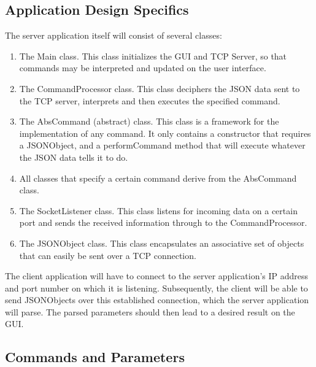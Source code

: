 \documentclass[11pt,a4paper,twocolumn]{article}
\begin{document}
\subsection{Application Design Specifics}
The server application itself will consist of several classes:
\begin{enumerate}
\item The Main class. This class initializes the GUI and TCP Server, so that commands may be interpreted and updated on the user interface.
\item The CommandProcessor class. This class deciphers the JSON data sent to the TCP server, interprets and then executes the specified command.
\item The AbsCommand (abstract) class. This class is a framework for the implementation of any command. It only contains a constructor that requires a JSONObject, and a performCommand method that will execute whatever the JSON data tells it to do.
\item All classes that specify a certain command derive from the AbsCommand class.
\item The SocketListener class. This class listens for incoming data on a certain port and sends the received information through to the CommandProcessor.
\item The JSONObject class. This class encapsulates an associative set of objects that can easily be sent over a TCP connection.
\end{enumerate}
The client application will have to connect to the server application's IP address and port number on which it is listening. Subsequently, the client will be able to send JSONObjects over this established connection, which the server application will parse. The parsed parameters should then lead to a desired result on the GUI.

\subsection{Commands and Parameters}
\end{document}
